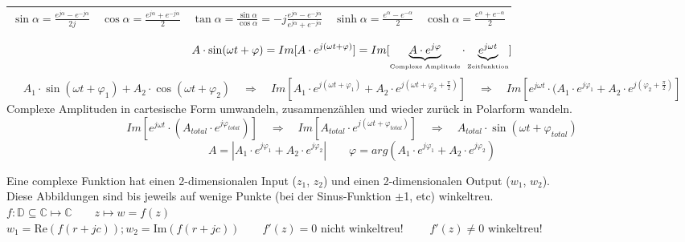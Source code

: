 \renewcommand{\arraystretch}{1.5}
\begin{tabular}{| l | l | l | l | l |}
\hline
	$\sin{\alpha} = \frac{e^{j\alpha} - e^{-j\alpha}}{2j}$ &

	$\cos{\alpha} = \frac{e^{j\alpha} + e^{-j\alpha}}{2}$ &

	$\tan{\alpha} = \frac{\sin \alpha}{\cos \alpha} = -j \frac{e^{j\alpha}-e^{-j\alpha}}{e^{j\alpha}+e^{-j\alpha}}$ & 

	$\sinh{\alpha} = \frac{e^\alpha - e^{-\alpha}}{2} $ &

	$\cosh{\alpha} = \frac{e^\alpha + e^{-\alpha}}{2} $\\
\hline
\end{tabular}
\renewcommand{\arraystretch}{1}

$$A \cdot \sin(\omega t + \varphi) = Im[A \cdot e^{j(\omega t + \varphi)}] =
Im[\underbrace{A \cdot e^{j\varphi}}_{\text{\tiny{Complexe Amplitude}}}
\cdot \underbrace{e^{j\omega t}}_{\text{\tiny{Zeitfunktion}}}]$$
%
%
$$ A_1 \cdot \sin(\omega t + \varphi_1) + A_2 \cdot \cos(\omega t + \varphi_2) 
 \quad \Rightarrow \quad 
 Im[A_1 \cdot e^{j(\omega t + \varphi_1)} + A_2 \cdot e^{j (\omega t + \varphi_2
 + \frac{\pi}{2})}] \quad \Rightarrow \quad 
 Im[e^{j \omega t} \cdot  (A_1 \cdot e^{j \varphi_1} + A_2 \cdot e^{j (\varphi_2
 + \frac{\pi}{2})}]$$ 
Complexe Amplituden in cartesische Form umwandeln, zusammenzählen und wieder
zurück in Polarform wandeln.
$$ Im[e^{j \omega t} \cdot  (A_{total} \cdot e^{j \varphi_{total}})] 
 \quad \Rightarrow \quad 
 Im[A_{total} \cdot e^{j (\omega t + \varphi_{total})}] 
 \quad \Rightarrow \quad 
 A_{total} \cdot \sin(\omega t + \varphi_{total})$$ 
$$A = |A_1 \cdot e^{j\varphi_1} + A_2 \cdot e^{j\varphi_2}| \qquad \varphi = arg(A_1 \cdot e^{j\varphi_1} + A_2 \cdot e^{j\varphi_2})$$


{}
Eine complexe Funktion hat einen 2-dimensionalen Input ($z_1$, $z_2$) und einen
2-dimensionalen Output ($w_1$, $w_2$). \\
Diese Abbildungen sind bis jeweils auf wenige Punkte (bei der Sinus-Funktion
$\pm$1, etc) winkeltreu.\\
$ f: \mathbb{D} \subseteq \mathbb{C} \mapsto \mathbb{C} \qquad z  \mapsto w = f(z)$\\
$w_1 = \text{Re}(f(r+jc)); w_2 = \text{Im}(f(r+jc)) \qquad f'(z) = 0$ nicht winkeltreu! $\qquad f'(z) \neq 0$ winkeltreu! 
 

